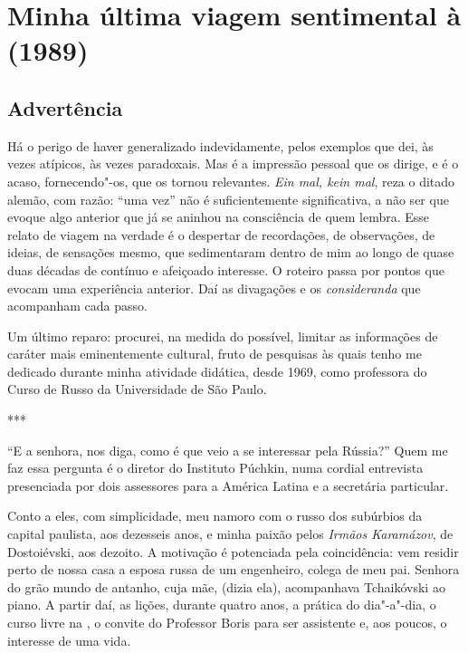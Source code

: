 \chapter{Minha última viagem sentimental à  (1989)}

\section{Advertência}

Há o perigo de haver generalizado indevidamente, pelos exemplos que dei,
às vezes atípicos, às vezes paradoxais. Mas é a impressão pessoal que os
dirige, e é o acaso, fornecendo"-os, que os tornou relevantes. \emph{Ein
mal, kein mal}, reza o ditado alemão, com razão: ``uma vez''
não é suficientemente significativa, a não ser que evoque
algo anterior que já se aninhou na consciência de quem lembra. Esse
relato de viagem na verdade é o despertar de recordações, de
observações, de ideias, de sensações mesmo, que sedimentaram dentro de
mim ao longo de quase duas décadas de contínuo e afeiçoado interesse. O
roteiro passa por pontos que evocam uma experiência anterior. Daí as
divagações e os \emph{consideranda} que acompanham cada passo.

Um último reparo: procurei, na medida do possível, limitar as
informações de caráter mais eminentemente cultural, fruto de pesquisas
às quais tenho me dedicado durante minha atividade didática, desde 1969, como
professora do Curso de Russo da Universidade de São Paulo.

\begin{center}
***
\end{center}

``E a senhora, nos diga, como é que veio a se interessar pela Rússia?''
Quem me faz essa pergunta é o diretor do Instituto Púchkin, numa cordial
entrevista presenciada por dois assessores para a América Latina e a
secretária particular.

Conto a eles, com simplicidade, meu namoro com o russo dos subúrbios da
capital paulista, aos dezesseis anos, e minha paixão pelos \emph{Irmãos
Karamázov}, de Dostoiévski, aos dezoito. A motivação é potenciada pela
coincidência: vem residir perto de nossa casa a esposa russa de um
engenheiro, colega de meu pai. Senhora do grão mundo de antanho, cuja
mãe, (dizia ela), acompanhava Tchaikóvski ao piano. A partir daí, as
lições, durante quatro anos, a prática do dia"-a"-dia, o curso livre na
, o convite do Professor Boris para ser assistente e, aos poucos, o
interesse de uma vida.

